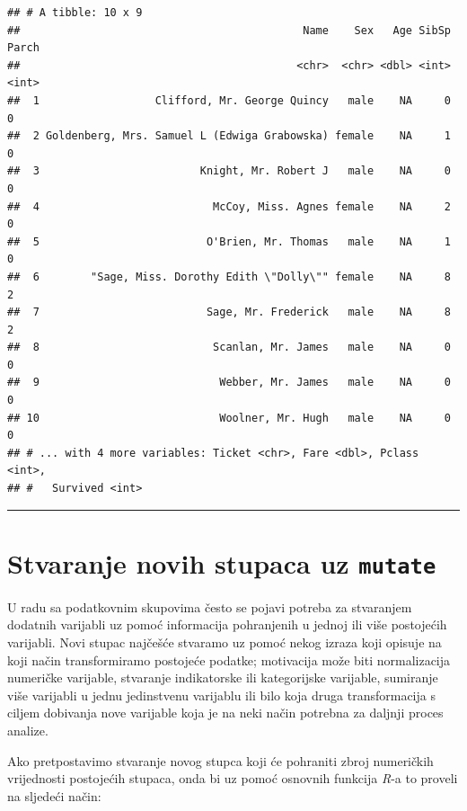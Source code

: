 \documentclass[]{book}
\newenvironment{Shaded}{\begin{snugshade}}{\end{snugshade}}
\newcommand{\StringTok}[1]{\textcolor[rgb]{0.31,0.60,0.02}{#1}}
\newcommand{\OperatorTok}[1]{\textcolor[rgb]{0.81,0.36,0.00}{\textbf{#1}}}
\newcommand{\NormalTok}[1]{#1}
\theoremstyle{definition}
\theoremstyle{definition}
\theoremstyle{definition}
\theoremstyle{remark}
\begin{document}
\begin{verbatim}
## # A tibble: 10 x 9
##                                            Name    Sex   Age SibSp Parch
##                                           <chr>  <chr> <dbl> <int> <int>
##  1                  Clifford, Mr. George Quincy   male    NA     0     0
##  2 Goldenberg, Mrs. Samuel L (Edwiga Grabowska) female    NA     1     0
##  3                         Knight, Mr. Robert J   male    NA     0     0
##  4                           McCoy, Miss. Agnes female    NA     2     0
##  5                          O'Brien, Mr. Thomas   male    NA     1     0
##  6        "Sage, Miss. Dorothy Edith \"Dolly\"" female    NA     8     2
##  7                          Sage, Mr. Frederick   male    NA     8     2
##  8                           Scanlan, Mr. James   male    NA     0     0
##  9                            Webber, Mr. James   male    NA     0     0
## 10                            Woolner, Mr. Hugh   male    NA     0     0
## # ... with 4 more variables: Ticket <chr>, Fare <dbl>, Pclass <int>,
## #   Survived <int>
\end{verbatim}

\begin{center}\rule{0.5\linewidth}{\linethickness}\end{center}

\section{\texorpdfstring{Stvaranje novih stupaca uz
\texttt{mutate}}{Stvaranje novih stupaca uz mutate}}\label{stvaranje-novih-stupaca-uz-mutate}

U radu sa podatkovnim skupovima često se pojavi potreba za stvaranjem
dodatnih varijabli uz pomoć informacija pohranjenih u jednoj ili više
postojećih varijabli. Novi stupac najčešće stvaramo uz pomoć nekog
izraza koji opisuje na koji način transformiramo postojeće podatke;
motivacija može biti normalizacija numeričke varijable, stvaranje
indikatorske ili kategorijske varijable, sumiranje više varijabli u
jednu jedinstvenu varijablu ili bilo koja druga transformacija s ciljem
dobivanja nove varijable koja je na neki način potrebna za daljnji
proces analize.

Ako pretpostavimo stvaranje novog stupca koji će pohraniti zbroj
numeričkih vrijednosti postojećih stupaca, onda bi uz pomoć osnovnih
funkcija \emph{R}-a to proveli na sljedeći način:

\begin{Shaded}
\end{Shaded}
\end{document}
